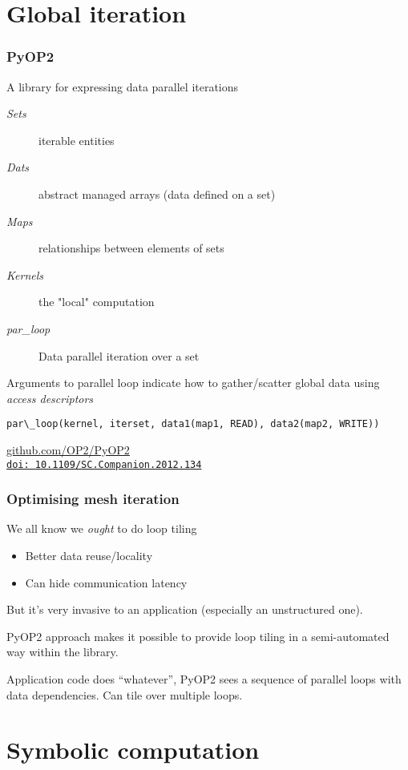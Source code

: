 \documentclass[presentation]{beamer}
\newcommand{\doilink}[1]{%
  \href{http://dx.doi.org/#1}%
  {{\small\texttt{doi:\,#1}{}}}%
}
\begin{document}
\section{Global iteration}

\begin{frame}[fragile]
  \frametitle{PyOP2}
  A library for expressing data parallel iterations
\begin{description}
\item[{\emph{Sets}}] iterable entities
\item[{\emph{Dats}}] abstract managed arrays (data defined on a set)
\item[{\emph{Maps}}] relationships between elements of sets
\item[{\emph{Kernels}}] the "local" computation
\item[{\emph{par\_loop}}] Data parallel iteration over a set
\end{description}
Arguments to parallel loop indicate how to gather/scatter global
data using \emph{access descriptors}

\begin{verbatim}
par\_loop(kernel, iterset, data1(map1, READ), data2(map2, WRITE))
\end{verbatim}
\begin{center}
  \url{github.com/OP2/PyOP2}\\
  \cite{Rathgeber:2012} \doilink{10.1109/SC.Companion.2012.134}
\end{center}
\end{frame}

\begin{frame}
  \frametitle{Optimising mesh iteration}
  We all know we \emph{ought} to do loop tiling
  \begin{itemize}
  \item Better data reuse/locality
  \item Can hide communication latency
  \end{itemize}
  But it's very invasive to an application (especially an unstructured
  one).

  PyOP2 approach makes it possible to provide loop tiling in a
  semi-automated way within the library.

  Application code does ``whatever'', PyOP2 sees a sequence of
  parallel loops with data dependencies.  Can tile over multiple
  loops.
\end{frame}


\section{Symbolic computation}
\end{document}
